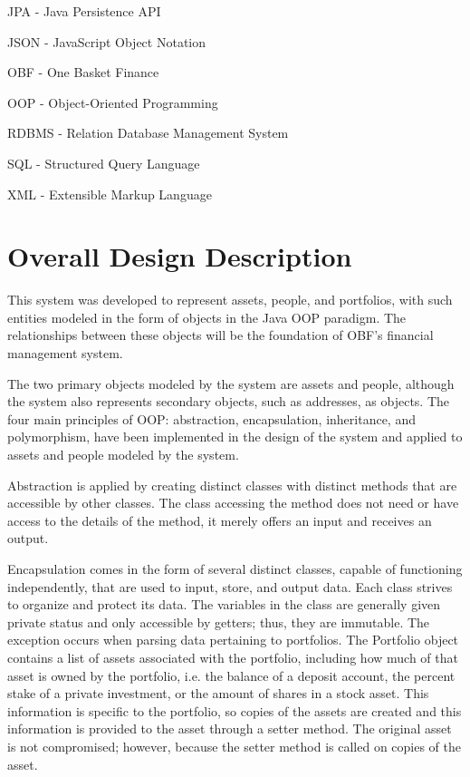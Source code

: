 \documentclass[12pt]{scrartcl} %
\begin{document}
    JPA - Java Persistence API

    JSON - JavaScript Object Notation

    OBF - One Basket Finance

    OOP - Object-Oriented Programming

    RDBMS - Relation Database Management System

    SQL - Structured Query Language

    XML - Extensible Markup Language

    \section{Overall Design Description}

    This system was developed to represent assets, people, and portfolios, with such entities modeled in the form of objects in the Java OOP paradigm.  The relationships between these objects will be the foundation of OBF's financial management system.

    The two primary objects modeled by the system are assets and people, although the system also represents secondary objects, such as addresses, as objects.  The four main principles of OOP:  abstraction, encapsulation, inheritance, and polymorphism, have been implemented in the design of the system and applied to assets and people modeled by the system.

    Abstraction is applied by creating distinct classes with distinct methods that are accessible by other classes.  The class accessing the method does not need or have access to the details of the method, it merely offers an input and receives an output.

    Encapsulation comes in the form of several distinct classes, capable of functioning independently, that are used to input, store, and output data.  Each class strives to organize and protect its data.  The variables in the class are generally given private status and only accessible by getters; thus, they are immutable.  The exception occurs when parsing data pertaining to portfolios.  The Portfolio object contains a list of assets associated with the portfolio, including how much of that asset is owned by the portfolio, i.e. the balance of a deposit account, the percent stake of a private investment, or the amount of shares in a stock asset.  This information is specific to the portfolio, so copies of the assets are created and this information is provided to the asset through a setter method.  The original asset is not compromised; however, because the setter method is called on copies of the asset.
\end{document}
